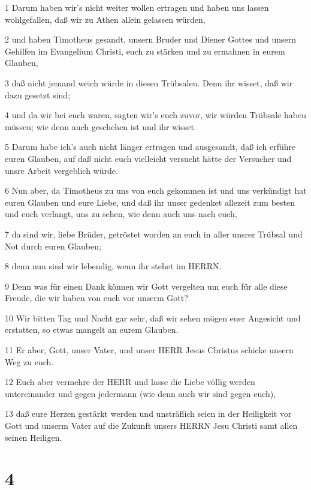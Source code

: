 \par 1 Darum haben wir's nicht weiter wollen ertragen und haben uns lassen wohlgefallen, daß wir zu Athen allein gelassen würden,
\par 2 und haben Timotheus gesandt, unsern Bruder und Diener Gottes und unsern Gehilfen im Evangelium Christi, euch zu stärken und zu ermahnen in eurem Glauben,
\par 3 daß nicht jemand weich würde in diesen Trübsalen. Denn ihr wisset, daß wir dazu gesetzt sind;
\par 4 und da wir bei euch waren, sagten wir's euch zuvor, wir würden Trübsale haben müssen; wie denn auch geschehen ist und ihr wisset.
\par 5 Darum habe ich's auch nicht länger ertragen und ausgesandt, daß ich erführe euren Glauben, auf daß nicht euch vielleicht versucht hätte der Versucher und unsre Arbeit vergeblich würde.
\par 6 Nun aber, da Timotheus zu uns von euch gekommen ist und uns verkündigt hat euren Glauben und eure Liebe, und daß ihr unser gedenket allezeit zum besten und euch verlangt, uns zu sehen, wie denn auch uns nach euch,
\par 7 da sind wir, liebe Brüder, getröstet worden an euch in aller unsrer Trübsal und Not durch euren Glauben;
\par 8 denn nun sind wir lebendig, wenn ihr stehet im HERRN.
\par 9 Denn was für einen Dank können wir Gott vergelten um euch für alle diese Freude, die wir haben von euch vor unserm Gott?
\par 10 Wir bitten Tag und Nacht gar sehr, daß wir sehen mögen euer Angesicht und erstatten, so etwas mangelt an eurem Glauben.
\par 11 Er aber, Gott, unser Vater, und unser HERR Jesus Christus schicke unsern Weg zu euch.
\par 12 Euch aber vermehre der HERR und lasse die Liebe völlig werden untereinander und gegen jedermann (wie denn auch wir sind gegen euch),
\par 13 daß eure Herzen gestärkt werden und unsträflich seien in der Heiligkeit vor Gott und unserm Vater auf die Zukunft unsers HERRN Jesu Christi samt allen seinen Heiligen.

\chapter{4}

